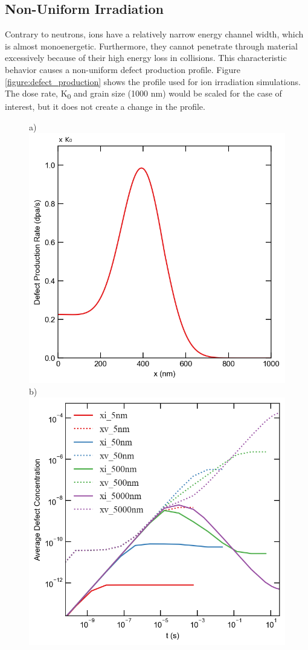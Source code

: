 \documentclass[utf8]{frontiersSCNS} %
\begin{document}
\clearpage
\subsection{Non-Uniform Irradiation}
    Contrary to neutrons, ions have a relatively narrow energy channel width, which is almost monoenergetic. Furthermore, they cannot penetrate through material excessively because of their high energy loss in collisions. This characteristic behavior causes a non-uniform defect production profile. Figure \ref{figure:defect_production} shows the profile used for ion irradiation simulations. The dose rate, K\textsubscript{0} and grain size (1000 nm) would be scaled for the case of interest, but it does not create a change in the profile.
    \begin{figure}[h!]  %
        \centering
        a)\includegraphics[scale=0.27]{defect_production}
        \qquad
        b)\includegraphics[scale=0.55]{average_concentration_ion_5_size}

\end{figure}
\end{document}
